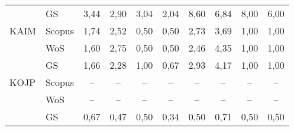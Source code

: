 \begin{table}
\begin{tabular}{llcccccccc}
      & GS     & 3,44     & 2,90 & 3,04 & 2,04 & 8,60    & 6,84 & 8,00 & 6,00 \\[1ex]
 KAIM & Scopus & 1,74     & 2,52 & 0,50 & 0,50 & 2,73    & 3,69 & 1,00 & 1,00 \\
      & WoS    & 1,60     & 2,75 & 0,50 & 0,50 & 2,46    & 4,35 & 1,00 & 1,00 \\
      & GS     & 1,66     & 2,28 & 1,00 & 0,67 & 2,93    & 4,17 & 1,00 & 1,00 \\[1ex]
 KOJP & Scopus & --       & --   & --   & --   & --      & --   & --   & --   \\
      & WoS    & --       & --   & --   & --   & --      & --   & --   & --   \\
      & GS     & 0,67     & 0,47 & 0,50 & 0,34 & 0,50    & 0,71 & 0,50 & 0,50 \\[0.5ex]
  \bottomrule
\end{tabular}
\end{table}

